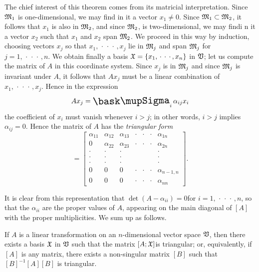 The chief interest of this theorem comes from its matricial interpretation.
Since \(\mathfrak{M}_1\) is one-dimensional, we may find in it a vector \(x_1 \neq
0\). Since \(\mathfrak{M}_1 \subset \mathfrak{M}_2\), it follows that \(x_1\) is also in
\(\mathfrak{M}_2\), and since \(\mathfrak{M}_2\), is two-dimensional, we may findi n it a
vector \(x_2\) such that \(x_1\) and \(x_2\) span \(\mathfrak{M}_2\). We proceed in
this way by induction, choosing vectors \(x_j\) so that \(x_1,
\,\cdot\,\cdot\,\cdot\,, x_j\) lie in \(\mathfrak{M}_j\) and span \(\mathfrak{M}_j\) for \(j
= 1, \,\cdot\,\cdot\,\cdot\,, n\). We obtain finally a basis \(\mathfrak{X} = \{x_1,
\,\cdot\,\cdot\,\cdot\,, x_n\}\) in \(\mathfrak{V}\); let us compute the matrix of
\(A\) in this coordinate system. Since \(x_j\) is in \(\mathfrak{M}_j\) and since
\(\mathfrak{M}_j\) is invariant under \(A\), it follows that \(Ax_j\) must be a linear
combination of \(x_1, \,\cdot\,\cdot\,\cdot\,, x_j\). Hence in the expression
\begin{equation*}
    Ax_j = \sumx_i \alpha_{ij} x_i
\end{equation*}
the coefficient of \(x_i\) must vanish whenever \(i > j\); in other words, \(i > j\) implies \(\alpha_{ij} = 0\). Hence the matrix of \(A\) has the \emph{triangular form}
\begin{equation*}
    [A] = \left[
        \begin{array}{ccccccc}
            \alpha_{11} & \alpha_{12} & \alpha_{13} & \cdot & \cdot & \cdot & \alpha_{1n} \\
            0 & \alpha_{22} & \alpha_{23} & \cdot & \cdot & \cdot & \alpha_{2n} \\
            \cdot & \cdot & \cdot &  & & & \cdot \\
            \cdot & \cdot & \cdot &  & & & \cdot \\
            \cdot & \cdot & \cdot &  & & & \cdot \\
            0 & 0 & 0 & \cdot & \cdot & \cdot & \alpha_{{n-1},n} \\
            0 & 0 & 0 & \cdot & \cdot & \cdot & \alpha_{nn}
        \end{array}
    \right].
\end{equation*}

It is clear from this representation that \(\det (A - \alpha_{ii}) = 0 \)for \(i
= 1, \,\cdot\,\cdot\,\cdot\,, n\), so that the \(\alpha_{ii}\) are the proper values of \(A\),
appearing on the main diagonal of \([A]\) with the proper multiplicities. We sum
up as follows.

\begin{theorem}
    If \(A\) is a linear transformation on an \(n\)-dimensional vector space
    \(\mathfrak{V}\), then there exists a basis \(\mathfrak{X}\) in \(\mathfrak{V}\) such that
    the matrix \([A; \mathfrak{X}]\)is triangular; or, equivalently, if \([A]\) is
    any matrix, there exists a non-singular matrix \([B]\) such that
    \([B]^{-1}[A][B]\) is triangular.
\end{theorem}

